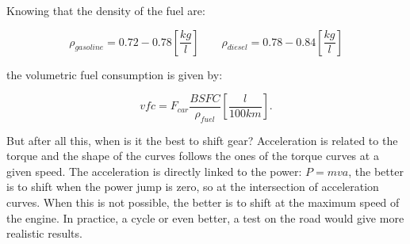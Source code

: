 	Knowing that the density of the fuel are: 
	
	\begin{equation}
	\rho _{gasoline} = 0.72 - 0.78 \left[\frac{kg}{l}\right] \qquad \rho _{diesel} = 0.78 - 0.84 \left[\frac{kg}{l}\right]
	\end{equation}	
	
	the volumetric fuel consumption is given by: 
	
	\begin{equation}
	vfc = F_{car}\frac{BSFC}{\rho _{fuel}} \left[\frac{l}{100 km}\right].
	\end{equation}
	
	But after all this, when is it the best to shift gear? Acceleration is related to the torque and the shape of the curves follows the ones of the torque curves at a given speed. The acceleration is directly linked to the power: $P= mva$, the better is to shift when the power jump is zero, so at the intersection of acceleration curves. When this is not possible, the better is to shift at the maximum speed of the engine. In practice, a cycle or even better, a test on the road would give more realistic results. 